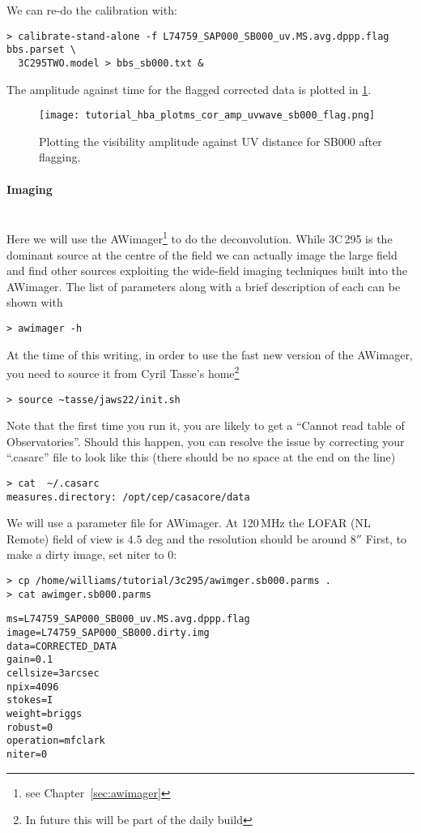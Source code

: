 We can re-do the calibration with:
\begin{verbatim}
> calibrate-stand-alone -f L74759_SAP000_SB000_uv.MS.avg.dppp.flag bbs.parset \
  3C295TWO.model > bbs_sb000.txt &
\end{verbatim}

The amplitude against time for the flagged corrected data is plotted in \ref{fig:corrected_plotms1_flag}.
\begin{figure}[htp]
 \centering
\texttt{[image: tutorial\_hba\_plotms\_cor\_amp\_uvwave\_sb000\_flag.png]}
\caption{Plotting the visibility amplitude against UV distance for SB000 after flagging.}
\label{fig:corrected_plotms1_flag}
\end{figure}


\paragraph{Imaging}\mbox{}\\

Here we will use the AWimager\footnote{see Chapter~\ref{sec:awimager}} to do the deconvolution. While 3C\,295 is the dominant source at the centre of the field we can actually image the large field and find other sources exploiting the wide-field imaging techniques built into the AWimager. The list  of parameters along with a brief description of each can be shown with
\begin{verbatim}
> awimager -h
\end{verbatim}

At the time of this writing, in order to use the fast new version of the AWimager, you need to source it from Cyril Tasse's home\footnote{In future this will be part of the daily build}
\begin{verbatim}
> source ~tasse/jaws22/init.sh
\end{verbatim}
Note that the first time you run it, you are likely to get a ``Cannot read table of Observatories''. Should this happen, you can resolve the issue by correcting your ``.casarc'' file to look like this (there should be no space at the end on the line)
\begin{verbatim}
> cat  ~/.casarc
measures.directory: /opt/cep/casacore/data
\end{verbatim}


We will use a parameter file for AWimager. At 120\,MHz the LOFAR (NL Remote) field of view is $4.5$ deg and the resolution should be around $8''$ First, to make a dirty image, set niter to 0:
\begin{verbatim}
> cp /home/williams/tutorial/3c295/awimger.sb000.parms .
> cat awimger.sb000.parms 
\end{verbatim}
\begin{lstlisting}
ms=L74759_SAP000_SB000_uv.MS.avg.dppp.flag
image=L74759_SAP000_SB000.dirty.img
data=CORRECTED_DATA
gain=0.1
cellsize=3arcsec
npix=4096
stokes=I
weight=briggs
robust=0
operation=mfclark
niter=0
\end{lstlisting}

